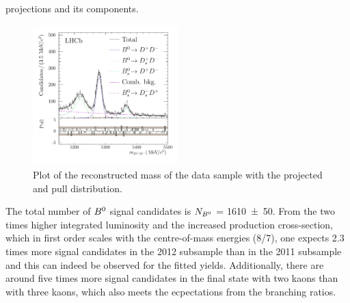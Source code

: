 projections and its components.
%
\begin{figure}[!htb]
\centering
\includegraphics[width=0.5\textwidth]{07-B02DD/tikz/pdf/obsMass_summed_pull.pdf}
\caption{Plot of the reconstructed mass of the \BdToDD data sample with the
projected \PDF and pull distribution.
}
\label{fig:massfit}
\end{figure}
%
The total number of ${{B}^0}$ signal candidates is $N_{{{B}^0}}$ = \num{1610\pm50}.
From the two times higher integrated luminosity and the increased production
cross-section, which in first order scales with the centre-of-mass energies
(8/7), one expects \num{2.3} times more signal candidates in the 2012 subsample
than in the 2011 subsample and this can indeed be observed for the fitted
yields. Additionally, there are around five times more signal candidates in
the final state with two kaons than with three kaons, which also meets the
ecpectations from the branching ratios.

\FloatBarrier